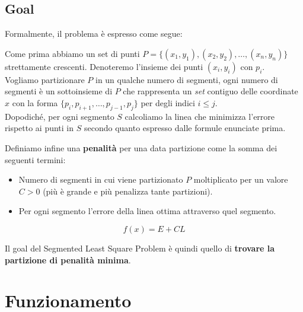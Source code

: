 \subsection{Goal}
Formalmente, il problema è espresso come segue:
\begin{myblockquote}
  Come prima abbiamo un set di punti
  $P = \{(x_1, y_1), (x_2, y_2), \ldots, (x_n, y_n)\}$ strettamente
  crescenti. Denoteremo l'insieme dei punti
  $(x_i, y_i)$ con $p_i$.\\
  Vogliamo partizionare $P$ in un qualche numero di segmenti, ogni numero di segmenti è un
  sottoinsieme di $P$ che rappresenta un \emph{set} contiguo delle
  coordinate $x$ con la forma
  $\{p_i, p_{i+1}, \ldots, p_{j-1}, p_j\}$ per degli indici
  $i \leq j$.\\
  Dopodiché, per ogni segmento $S$ calcoliamo la linea che minimizza l'errore rispetto ai punti in $S$
  secondo quanto espresso dalle formule enunciate prima.
\end{myblockquote}

Definiamo infine una \textbf{penalità} per una data partizione come la
somma dei seguenti termini:
\begin{itemize}
  \item Numero di segmenti in cui viene
        partizionato $P$ moltiplicato per un valore $C > 0$ (più è grande e
        più penalizza tante partizioni).
  \item Per ogni segmento l'errore della linea
        ottima attraverso quel segmento.
\end{itemize}

$$
  f(x) = E + C L
$$

Il goal del Segmented Least Square Problem è quindi quello di
\textbf{trovare la partizione di penalità minima}.

\section{Funzionamento}

